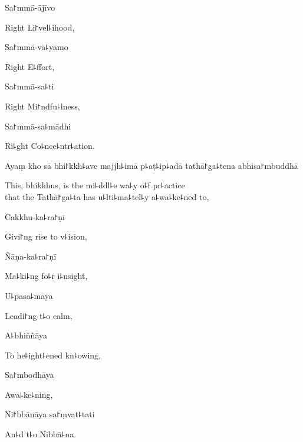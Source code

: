Sa꜓mmā-ājīvo

\begin{english}
  Right Li꜓vel꜕ihood,
\end{english}

Sa꜓mmā-vā꜕yāmo

\begin{english}
  Right E꜕ffort,
\end{english}

Sa꜓mmā-sa꜕ti

\begin{english}
  Right Mi꜓ndfu꜕lness,
\end{english}

Sa꜓mmā-sa꜕mādhi

\begin{english}
  Ri꜕ght Co꜕nce꜕ntr꜕ation.
\end{english}

Ayaṃ kho sā bhi꜓kkh꜕ave majjh꜕imā p꜕aṭ꜕ip꜕adā tathā꜓ga꜕tena abhisa꜓mbuddhā

\begin{english}
  This, bhikkhus, is the mi꜕ddl꜕e wa꜕y o꜕f pr꜕actice\\
  that the Tathā꜓ga꜕ta has u꜕lti꜕ma꜕tel꜕y a꜕wa꜕ke꜕ned to,
\end{english}

Cakkhu-ka꜕ra꜓ṇī

\begin{english}
  Givi꜓ng rise to v꜕ision,
\end{english}

Ñāṇa-ka꜕ra꜓ṇī

\begin{english}
  Ma꜕ki꜕ng fo꜕r i꜕nsight,
\end{english}

U꜕pasa꜕māya

\begin{english}
  Leadi꜓ng t꜕o calm,
\end{english}

A꜕bhiññāya

\begin{english}
  To he꜕ight꜕ened kn꜕owing,
\end{english}

Sa꜓mbodhāya

\begin{english}
  Awa꜕ke꜕ning,
\end{english}

Ni꜓bbānāya sa꜓ṃvat꜕tati

\begin{english}
  An꜕d t꜕o Nibbā꜕na.
\end{english}

